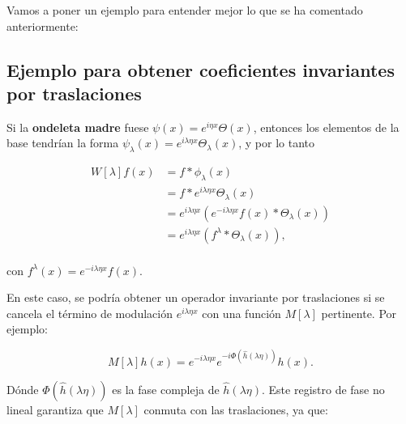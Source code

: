 \medskip

\noindent Vamos a poner un ejemplo para entender mejor lo que se ha comentado anteriormente: 

\subsection{Ejemplo para obtener coeficientes invariantes por traslaciones}

\noindent Si la \textbf{ondeleta madre} fuese $\psi(x)=e^{i\eta x}\Theta(x)$, entonces los elementos de la base tendrían la forma $\psi_\lambda(x)=e^{i\lambda\eta x}\Theta_\lambda(x)$, y por lo tanto 


\begin{align} \label{eq::1.4}
  W[\lambda]f(x) &= f \ast \phi_\lambda (x) \\
  &= f \ast e^{i\lambda\eta x}\Theta_\lambda(x) \\
  &=e^{i\lambda\eta x}(e^{-i\lambda\eta x}f(x) \ast \Theta_\lambda(x)) \\
  &=e^{i\lambda\eta x}(f^\lambda \ast \Theta_\lambda(x)),\\
\end{align}

\noindent con $f^\lambda(x)=e^{-i\lambda\eta x}f(x)$.

\medskip

\noindent En este caso, se podría obtener un operador invariante por traslaciones si se cancela el término de modulación $e^{i\lambda\eta x}$ con una función $M[\lambda]$ pertinente. Por ejemplo: 

\begin{equation}
  M[\lambda]h(x)=e^{-i\lambda\eta x} e^{-i \Phi(\widehat{h}(\lambda\eta))}h(x).
\end{equation}

\noindent Dónde $\Phi(\widehat{h}(\lambda\eta))$ es la fase compleja de $\widehat{h}(\lambda\eta)$. Este registro de fase no lineal garantiza que $M[\lambda]$ conmuta con las traslaciones, ya que: 



